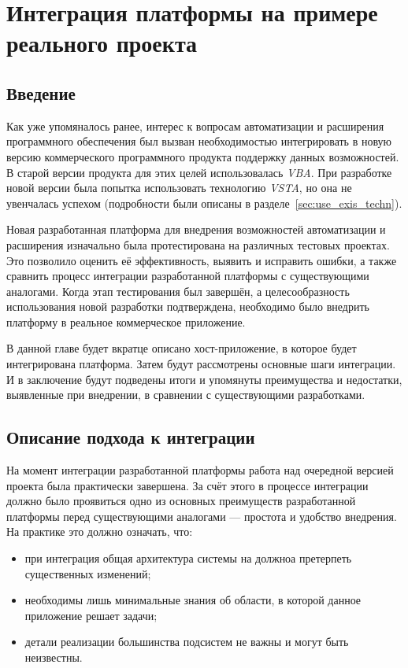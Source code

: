 \section{Интеграция платформы на примере реального проекта}

\subsection{Введение}

Как уже упомяналось ранее, интерес к вопросам автоматизации и расширения программного обеспечения был вызван необходимостью интегрировать в новую версию коммерческого программного продукта поддержку данных возможностей. В старой версии продукта для этих целей использовалась {\it VBA}. При разработке новой версии была попытка использовать технологию {\it VSTA}, но она не увенчалась успехом (подробности были описаны в разделе~\ref{sec:use_exis_techn}).

Новая разработанная платформа для внедрения возможностей автоматизации и расширения изначально была протестирована на различных тестовых проектах. Это позволило оценить её эффективность, выявить и исправить ошибки, а также сравнить процесс интеграции разработанной платформы с существующими аналогами. Когда этап тестирования был завершён, а целесообразность использования новой разработки подтверждена, необходимо было внедрить платформу в реальное коммерческое приложение. 

В данной главе будет вкратце описано хост-приложение, в которое будет интегрирована платформа. Затем будут рассмотрены основные шаги интеграции. И в заключение будут подведены итоги и упомянуты преимущества и недостатки, выявленные при внедрении, в сравнении с существующими разработками.

\subsection{Описание подхода к интеграции}

На момент интеграции разработанной платформы работа над очередной версией проекта была практически завершена. За счёт этого в процессе интеграции должно было проявиться одно из основных преимуществ разработанной платформы перед существующими аналогами --- простота и удобство внедрения. На практике это должно означать, что:
\begin{itemize}
 \item при интеграция общая архитектура системы на должноа претерпеть существенных изменений;
 \item необходимы лишь минимальные знания об области, в которой данное приложение решает задачи;
 \item детали реализации большинства подсистем не важны и могут быть неизвестны.
\end{itemize}

